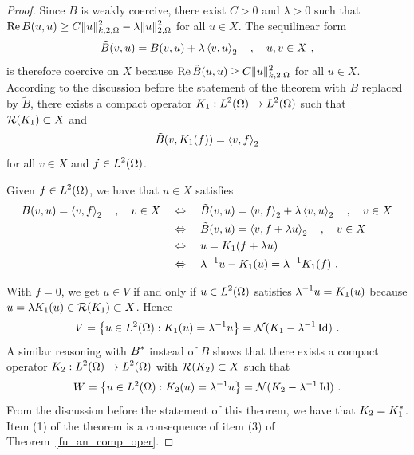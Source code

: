 \begin{proof}
Since $B$ is weakly coercive, there exist $C>0$ and $\lambda>0$ such
that $\displaystyle \operatorname{Re} B(u,u) \geq C \|u\|_{k,2,\Omega}^2
- \lambda \|u\|_{2,\Omega}^2$
for all $u \in X$.  The sequilinear form
\begin{equation} \label{ell_Bhat_sql}
\tilde{B}(v,u) = B(v,u) + \lambda\ps{v}{u}_2 \quad , \quad u,v \in X \ ,
\end{equation}
is therefore coercive on $X$ because
$\displaystyle \operatorname{Re} \tilde{B}(u,u) \geq C \|u\|_{k,2,\Omega}^2$
for all $u \in X$.  According to the discussion before the statement
of the theorem with $B$ replaced by $\tilde{B}$, there exists a
compact operator
$\displaystyle K_1:L^2(\Omega)\rightarrow L^2(\Omega)$ such that
$\mathcal{R}(K_1) \subset X$ and
\[
\tilde{B}(v,K_1(f)) = \left\langle{v} , {f}\right\rangle_2
\]
for all $v\in X$ and $\displaystyle f\in L^2(\Omega)$.

Given $\displaystyle f\in L^2(\Omega)$, we have that $u\in X$ satisfies
\begin{align}
B(v,u) = \left\langle{v} , {f}\right\rangle_2 \quad , \quad v\in X\quad &\Leftrightarrow \quad
\tilde{B}(v,u) = \left\langle{v} , {f}\right\rangle_2 + \lambda\left\langle{v} , {u}\right\rangle_2 \quad , \quad v \in X
\nonumber \\
&\Leftrightarrow \quad \tilde{B}(v,u) = \left\langle{v} , {f+\lambda u}\right\rangle_2 \quad ,
\quad v \in X \nonumber \\
&\Leftrightarrow \quad u = K_1(f+\lambda u) \nonumber \\
&\Leftrightarrow \quad \lambda^{-1} u - K_1(u) = \lambda^{-1} K_1(f) \ .
\label{ell_BK1u_K1f}
\end{align}

With $f=0$, we get $u\in V$ if and only if $\displaystyle u\in L^2(\Omega)$
satisfies $\displaystyle \lambda^{-1} u = K_1(u)$ because
$u = \lambda K_1(u) \in \mathcal{R}(K_1) \subset X$.
Hence
\[
V = \left\{ u \in L^2(\Omega) : K_1(u) = \lambda^{-1} u \right\} 
= \mathcal{N}(K_1-\lambda^{-1}\operatorname{Id}) \  .
\]
A similar reasoning with $\displaystyle B^\ast$ instead of $B$ shows that there
exists a compact operator
$\displaystyle K_2:L^2(\Omega) \rightarrow L^2(\Omega)$
with $\mathcal{R}(K_2) \subset X$ such that
\[
W = \left\{ u \in L^2(\Omega) : K_2(u) = \lambda^{-1} u \right\}
= \mathcal{N}(K_2-\lambda^{-1}\operatorname{Id}) \  .
\]
From the discussion before the statement of this theorem, we have that
$\displaystyle K_2= K_1^\ast$.  Item (1) of the theorem is a consequence of
item (3) of Theorem~\ref{fu_an_comp_oper}.


\end{proof}
